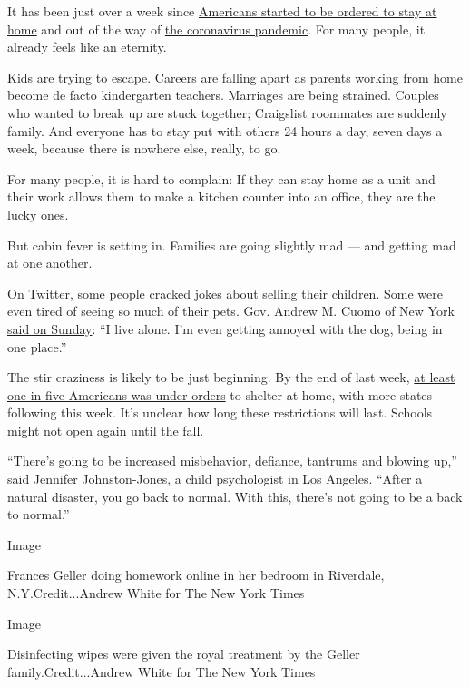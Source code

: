 It has been just over a week since
\href{https://www.nytimes3xbfgragh.onion/2020/03/17/us/california-shelter-in-place-coronavirus.html}{Americans
started to be ordered to stay at home} and out of the way of
\href{https://www.nytimes3xbfgragh.onion/news-event/coronavirus}{the
coronavirus pandemic}. For many people, it already feels like an
eternity.

Kids are trying to escape. Careers are falling apart as parents working
from home become de facto kindergarten teachers. Marriages are being
strained. Couples who wanted to break up are stuck together; Craigslist
roommates are suddenly family. And everyone has to stay put with others
24 hours a day, seven days a week, because there is nowhere else,
really, to go.

For many people, it is hard to complain: If they can stay home as a unit
and their work allows them to make a kitchen counter into an office,
they are the lucky ones.

But cabin fever is setting in. Families are going slightly mad --- and
getting mad at one another.

On Twitter, some people cracked jokes about selling their children. Some
were even tired of seeing so much of their pets. Gov. Andrew M. Cuomo of
New York
\href{https://www.wfmz.com/news/cnn/us-national/covid-gov-cuomo-my-dog-is-starting-to-annoy-me/video_eb15e561-282d-5432-9d0d-ebbdd97295e0.html}{said
on Sunday}: ``I live alone. I'm even getting annoyed with the dog, being
in one place.''

The stir craziness is likely to be just beginning. By the end of last
week,
\href{https://www.nytimes3xbfgragh.onion/2020/03/20/us/ny-ca-stay-home-order.html}{at
least one in five Americans was under orders} to shelter at home, with
more states following this week. It's unclear how long these
restrictions will last. Schools might not open again until the fall.

``There's going to be increased misbehavior, defiance, tantrums and
blowing up,'' said Jennifer Johnston-Jones, a child psychologist in Los
Angeles. ``After a natural disaster, you go back to normal. With this,
there's not going to be a back to normal.''

Image

Frances Geller doing homework online in her bedroom in Riverdale,
N.Y.Credit...Andrew White for The New York Times

Image

Disinfecting wipes were given the royal treatment by the Geller
family.Credit...Andrew White for The New York Times

